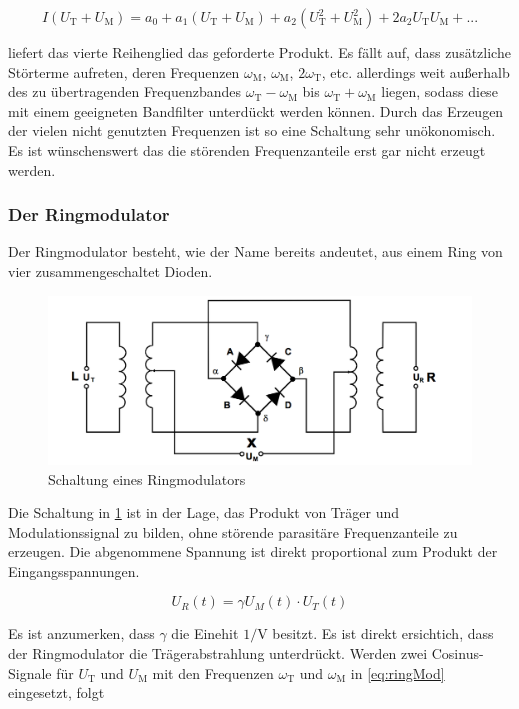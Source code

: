 \begin{equation}
I(U_\text{T} + U_\text{M}) = a_0 + a_1(U_\text{T} + U_\text{M}) + a_2(U_\text{T}^2 + U_\text{M}^2) + 2a_2 U_\text{T} U_\text{M} + ...
\end{equation}

liefert das vierte Reihenglied das geforderte Produkt. Es fällt auf, dass zusätzliche Störterme aufreten, deren Frequenzen  $\omega_\text{M}$, $\omega_\text{M}$, $2\omega_\text{T}$, etc. allerdings weit außerhalb des zu übertragenden Frequenzbandes $\omega_\text{T} - \omega_\text{M}$ bis $\omega_\text{T} + \omega_\text{M}$ liegen, sodass diese mit einem geeigneten Bandfilter unterdückt werden können.
Durch das Erzeugen der vielen nicht genutzten Frequenzen ist so eine Schaltung sehr unökonomisch. Es ist wünschenswert das die störenden Frequenzanteile erst gar nicht erzeugt werden.

\subsubsection{Der Ringmodulator}
Der Ringmodulator besteht, wie der Name bereits andeutet, aus einem Ring von vier zusammengeschaltet Dioden.

\begin{figure}
	\centering
	\includegraphics[width=\textwidth]{img/Abb5.png}
	\caption{Schaltung eines Ringmodulators \cite{FP}}
	\label{abb:ringMod}
\end{figure}

Die Schaltung in \ref{abb:ringMod} ist in der Lage, das Produkt von Träger und Modulationssignal zu bilden, ohne störende parasitäre Frequenzanteile zu erzeugen. Die abgenommene Spannung ist direkt proportional zum Produkt der Eingangsspannungen.

\begin{equation}
U_R(t) = \gamma U_M(t) \cdot U_T(t)
\label{eq:ringMod}
\end{equation}

Es ist anzumerken, dass $\gamma$ die Einehit $1 / \text{V}$ besitzt. Es ist direkt ersichtich, dass der Ringmodulator die Trägerabstrahlung unterdrückt. Werden zwei Cosinus-Signale für $U_\text{T}$ und $U_\text{M}$ mit den Frequenzen $\omega_\text{T}$ und $\omega_\text{M}$ in \ref{eq:ringMod} eingesetzt, folgt

